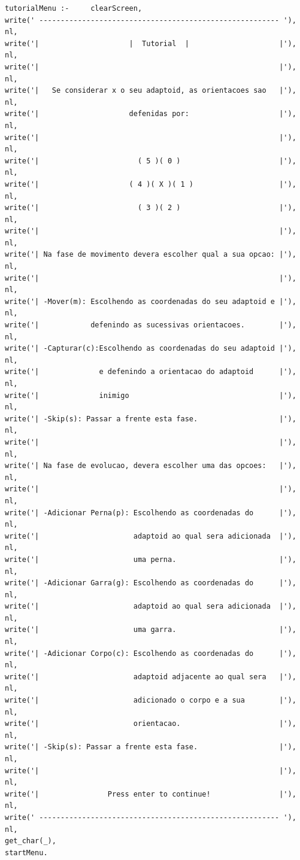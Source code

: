 \documentclass[a4paper]{article}
\begin{document}
\begin{lstlisting}
tutorialMenu :-     clearScreen,
write(' -------------------------------------------------------- '), nl,
write('|                     |  Tutorial  |                     |'), nl,
write('|                                                        |'), nl,
write('|   Se considerar x o seu adaptoid, as orientacoes sao   |'), nl,
write('|                     defenidas por:                     |'), nl,
write('|                                                        |'), nl,
write('|                       ( 5 )( 0 )                       |'), nl,
write('|                     ( 4 )( X )( 1 )                    |'), nl,
write('|                       ( 3 )( 2 )                       |'), nl,
write('|                                                        |'), nl,
write('| Na fase de movimento devera escolher qual a sua opcao: |'), nl,
write('|                                                        |'), nl,
write('| -Mover(m): Escolhendo as coordenadas do seu adaptoid e |'), nl,
write('|            defenindo as sucessivas orientacoes.        |'), nl,
write('| -Capturar(c):Escolhendo as coordenadas do seu adaptoid |'), nl,
write('|              e defenindo a orientacao do adaptoid      |'), nl,
write('|              inimigo                                   |'), nl,
write('| -Skip(s): Passar a frente esta fase.                   |'), nl,
write('|                                                        |'), nl,
write('| Na fase de evolucao, devera escolher uma das opcoes:   |'), nl,
write('|                                                        |'), nl,
write('| -Adicionar Perna(p): Escolhendo as coordenadas do      |'), nl,
write('|                      adaptoid ao qual sera adicionada  |'), nl,
write('|                      uma perna.                        |'), nl,
write('| -Adicionar Garra(g): Escolhendo as coordenadas do      |'), nl,
write('|                      adaptoid ao qual sera adicionada  |'), nl,
write('|                      uma garra.                        |'), nl,
write('| -Adicionar Corpo(c): Escolhendo as coordenadas do      |'), nl,
write('|                      adaptoid adjacente ao qual sera   |'), nl,
write('|                      adicionado o corpo e a sua        |'), nl,
write('|                      orientacao.                       |'), nl,
write('| -Skip(s): Passar a frente esta fase.                   |'), nl,
write('|                                                        |'), nl,
write('|                Press enter to continue!                |'), nl,
write(' -------------------------------------------------------- '), nl,
get_char(_),
startMenu.
\end{lstlisting}
\end{document}
